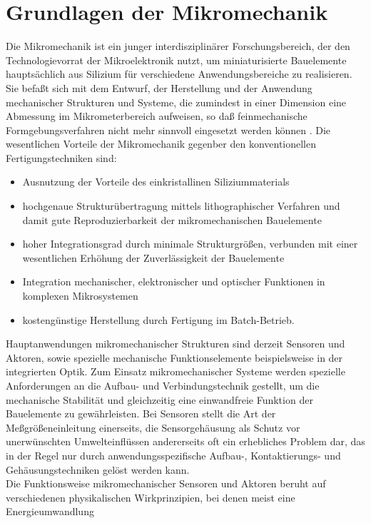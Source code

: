 \chapter{Grundlagen der Mikromechanik}
\label{grundlagen}

Die Mikromechanik ist ein junger interdisziplinärer Forschungsbereich, der
den Technologievorrat der Mikroelektronik nutzt, um miniaturisierte
Bauelemente hauptsächlich aus Silizium für verschiedene
Anwendungsbereiche zu realisieren. Sie befaßt
sich mit dem Entwurf, der Herstellung und der Anwendung mechanischer
Strukturen und Systeme, die zumindest in einer Dimension eine Abmessung
im Mikrometerbereich aufweisen, so daß feinmechanische Formgebungsverfahren
nicht mehr sinnvoll eingesetzt werden können \cite{Bue91a}. %
Die wesentlichen Vorteile der Mikromechanik gegenber den konventionellen
Fertigungstechniken sind:
%
\begin{itemize}
\item
Ausnutzung der Vorteile des einkristallinen Siliziummaterials
\item
hochgenaue Strukturübertragung mittels lithographischer Verfahren und damit
gute Reproduzierbarkeit der mikro\-mechanischen Bauelemente
\item
hoher Integrationsgrad durch minimale Strukturgrößen, verbunden mit
einer wesentlichen Erhöhung der Zuverlässigkeit der Bauelemente
\item
Integration mechanischer, elektronischer und optischer Funktionen
in komplexen Mikrosystemen
\item
kostengünstige Herstellung durch Fertigung im Batch-Betrieb.
\end{itemize}
%
Hauptanwendungen mikromechanischer Strukturen sind derzeit Sensoren und
Aktoren, sowie spezielle mechanische Funktionselemente beispielsweise in
der integrierten Optik.
Zum Einsatz mikromechanischer Systeme werden spezielle Anforderungen
an die Aufbau- und Verbindungstechnik gestellt, um die mechanische
Stabilität und gleichzeitig eine einwandfreie Funktion der Bauelemente zu
gewährleisten.  Bei Sensoren stellt die Art der Meßgrößeneinleitung
einerseits, die Sensorgehäusung als Schutz vor unerwünschten
Umwelteinflüssen andererseits oft ein erhebliches Problem dar, das in
der Regel nur durch anwendungsspezifische Aufbau-, Kontaktierungs-
und Gehäusungstechniken gelöst werden kann. \\
%
Die Funktionsweise
mikromechanischer Sensoren und Aktoren beruht auf verschiedenen
physikalischen Wirkprinzipien, bei denen meist eine Energieumwandlung
